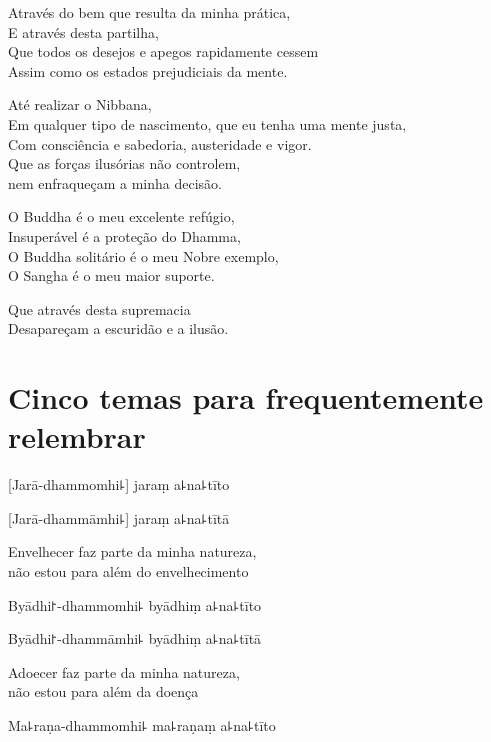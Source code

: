 \documentclass[
  babelLanguage=portuguese,
  final,
  showtrims,
]{chantingbook}
\begin{document}
Através do bem que resulta da minha prática,\\
E através desta partilha,\\
Que todos os desejos e apegos rapidamente cessem\\
Assim como os estados prejudiciais da mente.

Até realizar o Nibbana,\\
Em qualquer tipo de nascimento, que eu tenha uma mente justa,\\
Com consciência e sabedoria, austeridade e vigor.\\
Que as forças ilusórias não controlem,\\
nem enfraqueçam a minha decisão.

O Buddha é o meu excelente refúgio,\\
Insuperável é a proteção do Dhamma,\\
O Buddha solitário é o meu Nobre exemplo,\\
O Sangha é o meu maior suporte.

Que através desta supremacia\\
Desapareçam a escuridão e a ilusão.

\chapter[Cinco Temas]{Cinco temas para frequentemente relembrar}

\begin{leader}
\end{leader}

%
[Jarā-dhammomhi꜕] jaraṃ a꜕na꜕tīto

%
[Jarā-dhammāmhi꜕] jaraṃ a꜕na꜕tītā

\begin{english}
  Envelhecer faz parte da minha natureza,\\
  não estou para além do envelhecimento
\end{english}

%
Byādhi꜓-dhammomhi꜕ byādhiṃ a꜕na꜕tīto

%
Byādhi꜓-dhammāmhi꜕ byādhiṃ a꜕na꜕tītā

\begin{english}
  Adoecer faz parte da minha natureza,\\
  não estou para além da doença
\end{english}

%
Ma꜕raṇa-dhammomhi꜕ ma꜕raṇaṃ a꜕na꜕tīto
\end{document}
